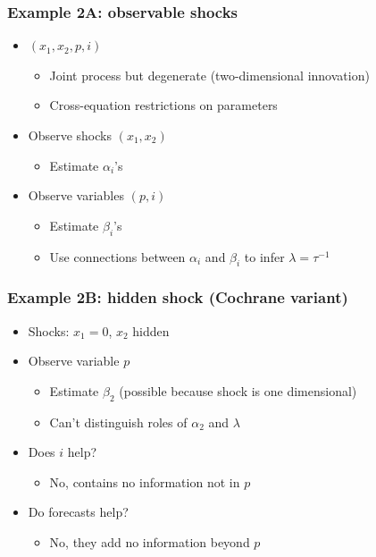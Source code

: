 \documentclass{beamer}
\begin{document}
\begin{frame}
\frametitle{Example 2A: observable shocks}
\begin{itemize}  \itemsep=\bigskipamount
\item $(x_1,x_2,p,i)$ \\
\begin{itemize}
\item Joint process but degenerate (two-dimensional innovation)
\item Cross-equation restrictions on parameters
\end{itemize}
\item Observe shocks $(x_1,x_2)$ \\
\begin{itemize}
\item Estimate $\alpha_i$'s
\end{itemize}
\item Observe variables $(p,i)$ \\
\begin{itemize}
\item Estimate $\beta_i$'s
\item Use connections between $\alpha_i$ and $\beta_i$ to infer $\lambda = \tau^{-1}$
\end{itemize}
\end{itemize}
\end{frame}

\begin{frame}
\frametitle{Example 2B: hidden shock (Cochrane variant)}
\begin{itemize}  \itemsep=\bigskipamount
\item Shocks:  $x_1 = 0$, $x_2$ hidden
\item Observe variable $p$  \\
\begin{itemize}
\item Estimate $\beta_2$  (possible because shock is one dimensional)
\item Can't distinguish roles of $\alpha_2$ and $\lambda$
\end{itemize}
\item Does $i$ help?  \\
\begin{itemize}
\item No, contains no information not in $p$
\end{itemize}
\item Do forecasts help? \\
\begin{itemize}
\item No, they add no information beyond $p$
\end{itemize}
\end{itemize}
\end{frame}
\end{document}
